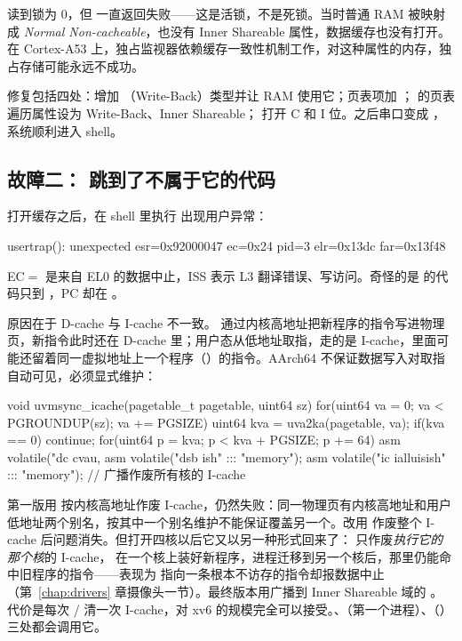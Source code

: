  读到锁为 0，但  一直返回失败——这是活锁，不是死锁。当时普通 RAM 被映射成 \emph{Normal Non-cacheable}，也没有 Inner Shareable 属性，数据缓存也没有打开。在 Cortex-A53 上，独占监视器依赖缓存一致性机制工作，对这种属性的内存，独占存储可能永远不成功。

修复包括四处：增加 （Write-Back）类型并让 RAM 使用它；页表项加 ； 的页表遍历属性设为 Write-Back、Inner Shareable； 打开 C 和 I 位。之后串口变成 ，系统顺利进入 shell。

\subsection{故障二： 跳到了不属于它的代码}

打开缓存之后，在 shell 里执行  出现用户异常：

\begin{txtcode}
usertrap(): unexpected esr=0x92000047 ec=0x24 pid=3
            elr=0x13dc far=0x13f48
\end{txtcode}

EC$=$ 是来自 EL0 的数据中止，ISS 表示 L3 翻译错误、写访问。奇怪的是  的代码只到 ，PC 却在 。

原因在于 D-cache 与 I-cache 不一致。 通过内核高地址把新程序的指令写进物理页，新指令此时还在 D-cache 里；用户态从低地址取指，走的是 I-cache，里面可能还留着同一虚拟地址上一个程序（）的指令。AArch64 不保证数据写入对取指自动可见，必须显式维护：

\begin{ccode}
void uvmsync_icache(pagetable_t pagetable, uint64 sz) {
  for(uint64 va = 0; va < PGROUNDUP(sz); va += PGSIZE){
    uint64 kva = uva2ka(pagetable, va);
    if(kva == 0) continue;
    for(uint64 p = kva; p < kva + PGSIZE; p += 64)
      asm volatile("dc cvau, %
  }
  asm volatile("dsb ish" ::: "memory");
  asm volatile("ic ialluis\n\tdsb ish\n\tisb" ::: "memory"); // 广播作废所有核的 I-cache
}
\end{ccode}

第一版用  按内核高地址作废 I-cache，仍然失败：同一物理页有内核高地址和用户低地址两个别名，按其中一个别名维护不能保证覆盖另一个。改用  作废整个 I-cache 后问题消失。但打开四核以后它又以另一种形式回来了： 只作废\emph{执行它的那个核}的 I-cache， 在一个核上装好新程序，进程迁移到另一个核后，那里仍能命中旧程序的指令——表现为  指向一条根本不访存的指令却报数据中止（第~\ref{chap:drivers} 章摄像头一节）。最终版本用广播到 Inner Shareable 域的 。代价是每次 / 清一次 I-cache，对 xv6 的规模完全可以接受。、（第一个进程）、（）三处都会调用它。

